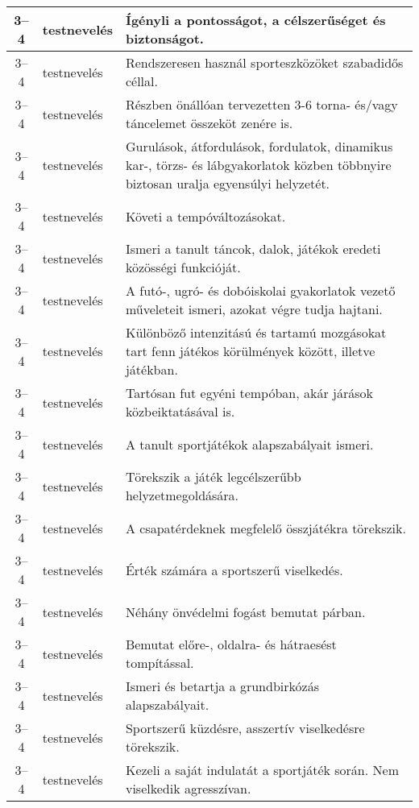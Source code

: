 \begin{small}
\begin{longtable}{c | p{2cm} |  p{11cm} }
              3--4 & testnevelés & Ígényli a pontosságot, a célszerűséget és biztonságot. \\ \hline
              3--4 & testnevelés & Rendszeresen használ sporteszközöket szabadidős céllal. \\ \hline
              3--4 & testnevelés & Részben önállóan tervezetten 3-6 torna- és/vagy táncelemet összeköt zenére is. \\ \hline
              3--4 & testnevelés & Gurulások, átfordulások, fordulatok, dinamikus kar-, törzs- és lábgyakorlatok közben többnyire biztosan uralja egyensúlyi helyzetét. \\ \hline
              3--4 & testnevelés & Követi a tempóváltozásokat. \\ \hline
              3--4 & testnevelés & Ismeri a tanult táncok, dalok, játékok eredeti közösségi funkcióját. \\ \hline
              3--4 & testnevelés & A futó-, ugró- és dobóiskolai gyakorlatok vezető műveleteit ismeri, azokat végre tudja hajtani. \\ \hline
              3--4 & testnevelés & Különböző intenzitású és tartamú mozgásokat tart fenn játékos körülmények között, illetve játékban. \\ \hline
              3--4 & testnevelés & Tartósan fut egyéni tempóban, akár járások közbeiktatásával is. \\ \hline
              3--4 & testnevelés & A tanult sportjátékok alapszabályait ismeri. \\ \hline
              3--4 & testnevelés & Törekszik a játék legcélszerűbb helyzetmegoldására. \\ \hline
              3--4 & testnevelés & A csapatérdeknek megfelelő összjátékra törekszik. \\ \hline
              3--4 & testnevelés & Érték számára a sportszerű viselkedés. \\ \hline
              3--4 & testnevelés & Néhány önvédelmi fogást bemutat párban. \\ \hline
              3--4 & testnevelés & Bemutat előre-, oldalra- és hátraesést tompítással. \\ \hline
              3--4 & testnevelés & Ismeri és betartja a grundbirkózás alapszabályait. \\ \hline
              3--4 & testnevelés & Sportszerű küzdésre, asszertív viselkedésre törekszik. \\ \hline
              3--4 & testnevelés & Kezeli a saját indulatát a sportjáték során. Nem viselkedik agresszívan. \\ \hline

\end{longtable}
\end{small}
